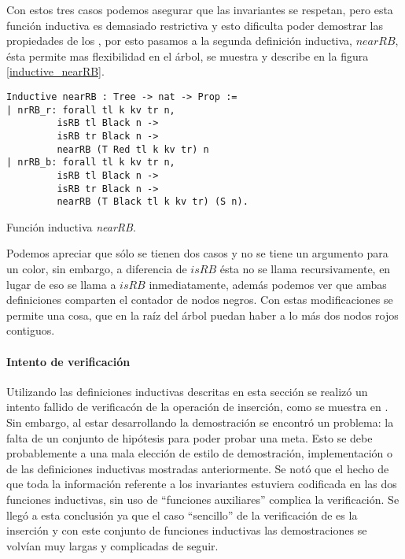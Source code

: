 Con estos tres casos podemos asegurar que las invariantes se respetan, pero esta funci\'on
inductiva es demasiado restrictiva y esto dificulta poder demostrar las propiedades de los {\arns},
por esto pasamos a la segunda definici\'on inductiva, \hyperref[inductive_nearRB]{$nearRB$}, \'esta 
permite mas flexibilidad en el \'arbol, se muestra y describe en la figura \ref{inductive_nearRB}.
\begin{listing}[!ht]
\centering
\captionsetup{justification=centering}
\begin{verbatim}
Inductive nearRB : Tree -> nat -> Prop :=
| nrRB_r: forall tl k kv tr n,
         isRB tl Black n ->
         isRB tr Black n ->
         nearRB (T Red tl k kv tr) n
| nrRB_b: forall tl k kv tr n,
         isRB tl Black n ->
         isRB tr Black n ->
         nearRB (T Black tl k kv tr) (S n).
\end{verbatim}
\caption{Funci\'on inductiva \emph{nearRB}.}
\label{inductive_nearRB}
\end{listing}

Podemos apreciar que s\'olo se tienen dos casos y no se tiene un argumento para un color, sin
embargo, a diferencia de \hyperref[inductive_isRB]{$isRB$} \'esta no se llama recursivamente, en lugar
de eso se llama a \hyperref[inductive_isRB]{$isRB$} inmediatamente, además podemos ver que ambas 
definiciones comparten el contador de nodos negros. Con estas modificaciones se permite una cosa, 
que en la ra\'iz del \'arbol puedan haber a lo m\'as dos nodos rojos contiguos.

\paragraph{Intento de verificaci\'on}
Utilizando las definiciones inductivas descritas en esta secci\'on se realiz\'o un intento fallido 
de verificac\'on de la operaci\'on de inserci\'on, como se muestra en \cite{appel}. Sin embargo, al
estar desarrollando la demostraci\'on se encontró un problema: la falta de un conjunto de
hipótesis para poder probar una meta. Esto se debe probablemente a una mala elección de estilo de
demostraci\'on, implementaci\'on o de las definiciones inductivas mostradas anteriormente. Se not\'o
que el hecho de que toda la informaci\'on referente a los invariantes estuviera codificada en las
dos funciones inductivas, sin uso de ``funciones auxiliares'' complica la verificaci\'on. Se
lleg\'o a esta conclusi\'on ya que el caso ``sencillo'' de la verificaci\'on de {\arns} es la 
inserci\'on y con este conjunto de funciones inductivas las demostraciones se volvían muy largas y
complicadas de seguir.

